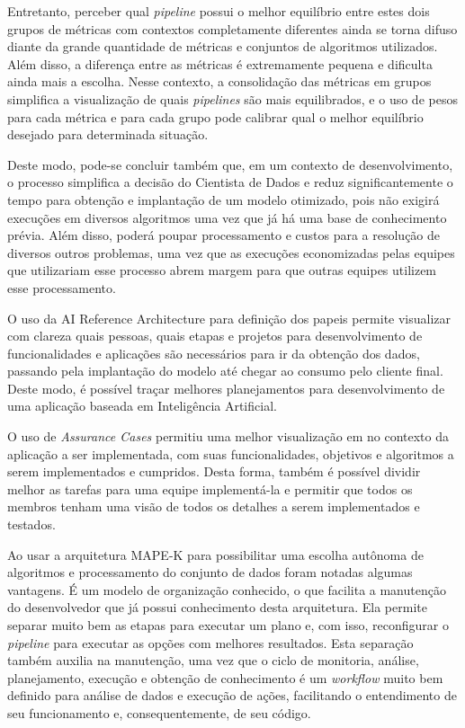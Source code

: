 \documentclass[portugues]{ic-tese}
\begin{document}
Entretanto, perceber qual \textit{pipeline} possui o melhor equilíbrio entre estes dois grupos de métricas com contextos completamente diferentes ainda se torna difuso diante da grande quantidade de métricas e conjuntos de algoritmos utilizados. Além disso, a diferença entre as métricas é extremamente pequena e dificulta ainda mais a escolha. Nesse contexto, a consolidação das métricas em grupos simplifica a visualização de quais \textit{pipelines} são mais equilibrados, e o uso de pesos para cada métrica e para cada grupo pode calibrar qual o melhor equilíbrio desejado para determinada situação.

Deste modo, pode-se concluir também que, em um contexto de desenvolvimento, o processo simplifica a decisão do Cientista de Dados e reduz significantemente o tempo para obtenção e implantação de um modelo otimizado, pois não exigirá execuções em diversos algoritmos uma vez que já há uma base de conhecimento prévia. Além disso, poderá poupar processamento e custos para a resolução de diversos outros problemas, uma vez que as execuções economizadas pelas equipes que utilizariam esse processo abrem margem para que outras equipes utilizem esse processamento.

O uso da AI Reference Architecture para definição dos papeis permite visualizar com clareza quais pessoas, quais etapas e projetos para desenvolvimento de funcionalidades e aplicações são necessários para ir da obtenção dos dados, passando pela implantação do modelo até chegar ao consumo pelo cliente final. Deste modo, é possível traçar melhores planejamentos para desenvolvimento de uma aplicação baseada em Inteligência Artificial.

O uso de \textit{Assurance Cases} permitiu uma melhor visualização em no contexto da aplicação a ser implementada, com suas funcionalidades, objetivos e algoritmos a serem implementados e cumpridos. Desta forma, também é possível dividir melhor as tarefas para uma equipe implementá-la e permitir que todos os membros tenham uma visão de todos os detalhes a serem implementados e testados.

Ao usar a arquitetura MAPE-K para possibilitar uma escolha autônoma de algoritmos e processamento do conjunto de dados foram notadas algumas vantagens. É um modelo de organização conhecido, o que facilita a manutenção do desenvolvedor que já possui conhecimento desta arquitetura. Ela permite separar muito bem as etapas para executar um plano e, com isso, reconfigurar o \textit{pipeline} para executar as opções com melhores resultados. Esta separação também auxilia na manutenção, uma vez que o ciclo de monitoria, análise, planejamento, execução e obtenção de conhecimento é um \textit{workflow} muito bem definido para análise de dados e execução de ações, facilitando o entendimento de seu funcionamento e, consequentemente, de seu código.
\end{document}

